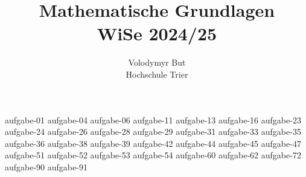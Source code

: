 \documentclass[10pt, oneside]{article}
\title{Mathematische Grundlagen\\[10pt]\Large{WiSe 2024/25}}
\author{Volodymyr But\\[10pt]Hochschule Trier}
\date{}
\begin{document}
\sloppy

\maketitle
\vspace{25px}

{aufgabe-01}
{aufgabe-04}
{aufgabe-06}
{aufgabe-11}
{aufgabe-13}
{aufgabe-16}
{aufgabe-23}
{aufgabe-24}
{aufgabe-26}
{aufgabe-28}
{aufgabe-29}
{aufgabe-31}
\pagebreak
{aufgabe-33}
\pagebreak
{aufgabe-35}
{aufgabe-36}
{aufgabe-38}
{aufgabe-39}
{aufgabe-42}
{aufgabe-44}
{aufgabe-45}
{aufgabe-47}
{aufgabe-51}
{aufgabe-52}
{aufgabe-53}
{aufgabe-54}
{aufgabe-60}
\pagebreak
{aufgabe-62}
{aufgabe-72}
{aufgabe-90}
{aufgabe-91}
\end{document}
